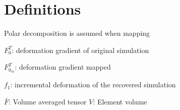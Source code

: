 \section{Definitions}
Polar decomposition is assumed when mapping

$F^T_0$: deformation gradient of original simulation

$F^T_{0_m}$: deformation gradient mapped

$f_{1}$: incremental deformation of the recovered simulation

$\bar{F}$: Volume averaged tensor
$V$: Element volume
